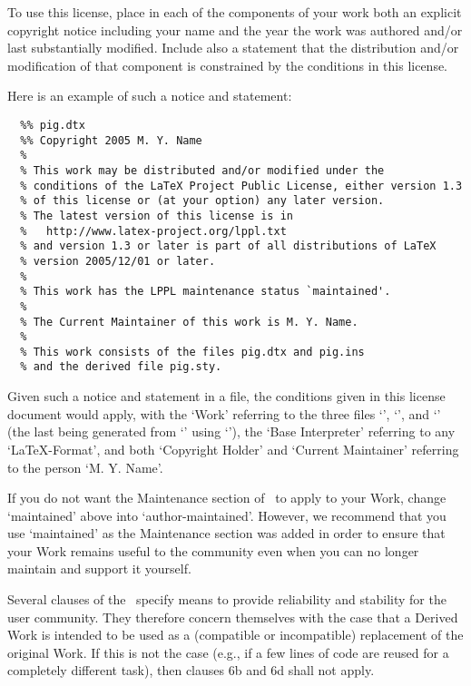 \begin{LPPLicense}
    \label{LPPL:HowTo}

    To use this license, place in each of the components of your work both an
    explicit copyright notice including your name and the year the work was
    authored and/or last substantially modified.  Include also a statement that
    the distribution and/or modification of that component is constrained by
    the conditions in this license.

    Here is an example of such a notice and statement:
\begin{verbatim}
  %% pig.dtx
  %% Copyright 2005 M. Y. Name
  %
  % This work may be distributed and/or modified under the
  % conditions of the LaTeX Project Public License, either version 1.3
  % of this license or (at your option) any later version.
  % The latest version of this license is in
  %   http://www.latex-project.org/lppl.txt
  % and version 1.3 or later is part of all distributions of LaTeX
  % version 2005/12/01 or later.
  %
  % This work has the LPPL maintenance status `maintained'.
  %
  % The Current Maintainer of this work is M. Y. Name.
  %
  % This work consists of the files pig.dtx and pig.ins
  % and the derived file pig.sty.
\end{verbatim}

    Given such a notice and statement in a file, the conditions given in this
    license document would apply, with the `Work' referring to the three files
    `', `', and `' (the
    last being generated from `' using `'),
    the `Base Interpreter' referring to any `\LaTeX-Format', and both
    `Copyright Holder' and `Current Maintainer' referring to the person `M. Y.
    Name'.

    If you do not want the Maintenance section of \LPPL\ to apply to your Work,
    change `maintained' above into `author-maintained'. However, we recommend
    that you use `maintained' as the Maintenance section was added in order to
    ensure that your Work remains useful to the community even when you can no
    longer maintain and support it yourself.


    \label{LPPL:NotReplacements}

    Several clauses of the \LPPL\ specify means to provide reliability and
    stability for the user community. They therefore concern themselves with
    the case that a Derived Work is intended to be used as a (compatible or
    incompatible) replacement of the original Work. If this is not the case
    (e.g., if a few lines of code are reused for a completely different task),
    then clauses 6b and 6d shall not apply.



\end{LPPLicense}
